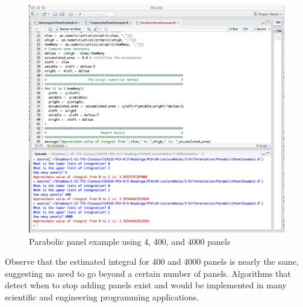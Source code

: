 \begin{figure}[h!] %
   \centering
   \includegraphics[width=6in]{./3-Differentation/ParaExample.jpg} 
   \caption{Parabolic panel example using 4, 400, and 4000 panels}
   \label{fig:ParaExample}
\end{figure}

Observe that the estimated integral for 400 and 4000 panels is nearly the same, suggesting no need to go beyond a certain number of panels.  
Algorithms that detect when to stop adding panels exist and would be implemented in many scientific and engineering programming applications.

